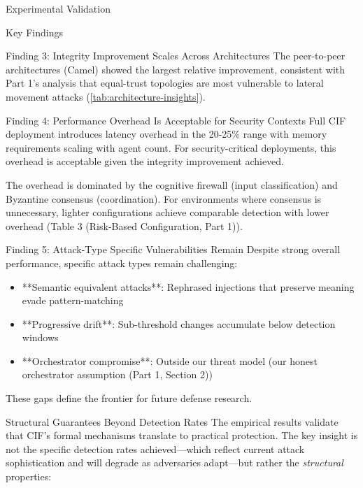 \documentclass[
  ignorenonframetext,
]{beamer}
\begin{document}
\begin{frame}[fragile]{Experimental Validation}
\begin{block}{Key Findings}
\begin{block}{Finding 3: Integrity Improvement Scales Across
Architectures}
The peer-to-peer architectures (Camel) showed the largest relative
improvement, consistent with Part 1's analysis that equal-trust
topologies are most vulnerable to lateral movement attacks
(\cref{tab:architecture-insights}).
\end{block}

\begin{block}{Finding 4: Performance Overhead Is Acceptable for Security
Contexts}
\protect{}\label{finding-4-performance-overhead-is-acceptable-for-security-contexts}
Full CIF deployment introduces latency overhead in the 20-25\% range
with memory requirements scaling with agent count. For security-critical
deployments, this overhead is acceptable given the integrity improvement
achieved.

The overhead is dominated by the cognitive firewall (input
classification) and Byzantine consensus (coordination). For environments
where consensus is unnecessary, lighter configurations achieve
comparable detection with lower overhead (Table 3 (Risk-Based
Configuration, Part 1)).
\end{block}

\begin{block}{Finding 5: Attack-Type Specific Vulnerabilities Remain}
\protect{}\label{finding-5-attack-type-specific-vulnerabilities-remain}
Despite strong overall performance, specific attack types remain
challenging:

\begin{itemize}
\item **Semantic equivalent attacks**: Rephrased injections that preserve meaning evade pattern-matching
\item **Progressive drift**: Sub-threshold changes accumulate below detection windows
\item **Orchestrator compromise**: Outside our threat model (our honest orchestrator assumption (Part 1, Section 2))
\end{itemize}

These gaps define the frontier for future defense research.
\end{block}
\end{block}

\begin{block}{Structural Guarantees Beyond Detection Rates}
\protect{}\label{structural-guarantees-beyond-detection-rates}
The empirical results validate that CIF's formal mechanisms translate to
practical protection. The key insight is not the specific detection
rates achieved---which reflect current attack sophistication and will
degrade as adversaries adapt---but rather the \textit{structural}
properties:


\end{block}
\end{frame}
\end{document}
